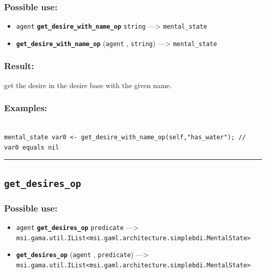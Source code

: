 \documentclass[]{book}
\providecommand{\tightlist}{%
  \setlength{\itemsep}{0pt}\setlength{\parskip}{0pt}}
\theoremstyle{definition}
\theoremstyle{definition}
\theoremstyle{definition}
\theoremstyle{remark}
\begin{document}
\subsubsection{Possible use:}\label{possible-use-204}

\begin{itemize}
\tightlist
\item
  \texttt{agent} \textbf{\texttt{get\_desire\_with\_name\_op}}
  \texttt{string} ---\textgreater{} \texttt{mental\_state}
\item
  \textbf{\texttt{get\_desire\_with\_name\_op}} (\texttt{agent} ,
  \texttt{string}) ---\textgreater{} \texttt{mental\_state}
\end{itemize}

\subsubsection{Result:}\label{result-198}

get the desire in the desire base with the given name.

\subsubsection{Examples:}\label{examples-151}

\begin{verbatim}
 
mental_state var0 <- get_desire_with_name_op(self,"has_water"); // var0 equals nil
\end{verbatim}

\begin{center}\rule{0.5\linewidth}{\linethickness}\end{center}

\subsection{\texorpdfstring{\texttt{get\_desires\_op}}{get\_desires\_op}}\label{get_desires_op}

\subsubsection{Possible use:}\label{possible-use-205}

\begin{itemize}
\tightlist
\item
  \texttt{agent} \textbf{\texttt{get\_desires\_op}} \texttt{predicate}
  ---\textgreater{}
  \texttt{msi.gama.util.IList\textless{}msi.gaml.architecture.simplebdi.MentalState\textgreater{}}
\item
  \textbf{\texttt{get\_desires\_op}} (\texttt{agent} ,
  \texttt{predicate}) ---\textgreater{}
  \texttt{msi.gama.util.IList\textless{}msi.gaml.architecture.simplebdi.MentalState\textgreater{}}
\end{itemize}
\end{document}
